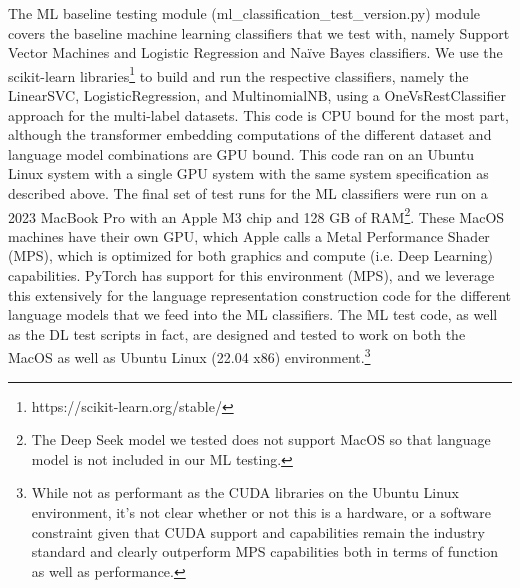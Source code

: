 \documentclass[final]{clv2025}
\begin{document}
The ML baseline testing module (ml\_classification\_test\_version.py) module covers the baseline machine learning classifiers that we test with, namely Support Vector Machines and Logistic Regression and Naïve Bayes classifiers. We use the scikit-learn libraries\footnote{https://scikit-learn.org/stable/} to build and run the respective classifiers, namely the LinearSVC, LogisticRegression, and MultinomialNB, using a OneVsRestClassifier approach for the multi-label datasets. This code is CPU bound for the most part, although the transformer embedding computations of the different dataset and language model combinations are GPU bound. This code ran on an Ubuntu Linux system with a single GPU system with the same system specification as described above. The final set of test runs for the ML classifiers were run on a 2023 MacBook Pro with an Apple M3 chip and 128 GB of RAM\footnote{The Deep Seek model we tested does not support MacOS so that language model is not included in our ML testing.}. These MacOS machines have their own GPU, which Apple calls a Metal Performance Shader (MPS), which is optimized for both graphics and compute (i.e. Deep Learning) capabilities. PyTorch has support for this environment (MPS), and we leverage this extensively for the language representation construction code for the different language models that we feed into the ML classifiers. The ML test code, as well as the DL test scripts in fact, are designed and tested to work on both the MacOS as well as Ubuntu Linux (22.04 x86) environment.\footnote{While not as performant as the CUDA libraries on the Ubuntu Linux environment, it’s not clear whether or not this is a hardware, or a software constraint given that CUDA support and capabilities remain the industry standard and clearly outperform MPS capabilities both in terms of function as well as performance.}
\end{document}
